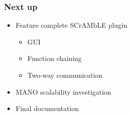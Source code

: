 \begin{frame}
\frametitle{Next up}

\begin{itemize}
	\item Feature complete SCrAMbLE plugin
		\begin{itemize}
			\item GUI
			\item Function chaining
			\item Two-way communication
		\end{itemize}
			
	\item MANO scalability investigation
	\item Final documentation	
\end{itemize}

\end{frame}